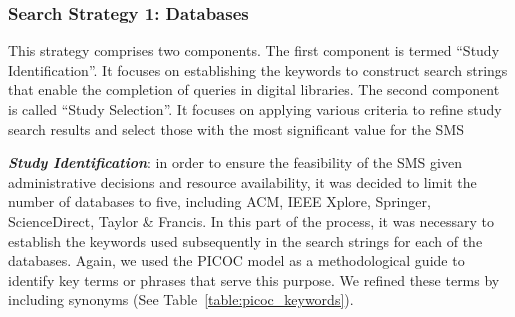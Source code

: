 
\newcommand{\acm}{518}
\newcommand{\ieee}{0}
\newcommand{\sd}{120}
\newcommand{\spr}{209}
\newcommand{\tf}{0}
\newcommand{\tot}{847}
\newcommand{\acmp}{\fpeval{round(\acm*100/\tot,2)}}
\newcommand{\ieeep}{\fpeval{round(\ieee*100/\tot,2)}}
\newcommand{\sdp}{\fpeval{round(\sd*100/\tot,2)}}
\newcommand{\sprp}{\fpeval{round(\spr*100/\tot,2)}}
\newcommand{\tfp}{\fpeval{round(\tf*100/\tot,2)}}


\newcommand{\iacm}{315}
\newcommand{\iieee}{0}
\newcommand{\isd}{101}
\newcommand{\ispr}{63}
\newcommand{\itf}{0}
\newcommand{\itot}{479}
\newcommand{\iacmp}{\fpeval{round(\iacm*100/\itot,2)}}
\newcommand{\iieeep}{\fpeval{round(\iieee*100/\itot,2)}}
\newcommand{\isdp}{\fpeval{round(\isd*100/\itot,2)}}
\newcommand{\isprp}{\fpeval{round(\ispr*100/\itot,2)}}
\newcommand{\itfp}{\fpeval{round(\itf*100/\itot,2)}}

\newcommand{\numEstEx}{3}

\newcommand{\depTot}{\fpeval{\itot-\numEstEx}}

\newcommand{\screen}{377}
\newcommand{\screenTot}{\fpeval{\depTot-\screen}}

\subsubsection{Search Strategy 1: Databases}

This strategy comprises two components. The first component is termed ``Study Identification''. It focuses on establishing the keywords to construct search strings that enable the completion of queries in digital libraries. The second component is called ``Study Selection''. It focuses on applying various criteria to refine study search results and select those with the most significant value for the SMS\@

\textit{\textbf{Study Identification}}: in order to ensure the feasibility of the SMS given administrative decisions and resource availability, it was decided to limit the number of databases to five, including ACM, IEEE Xplore, Springer, ScienceDirect, Taylor \& Francis. In this part of the process, it was necessary to establish the keywords used subsequently in the search strings for each of the databases. Again, we used the PICOC model as a methodological guide to identify key terms or phrases that serve this purpose. We refined these terms by including synonyms (See Table~\ref{table:picoc_keywords}).

